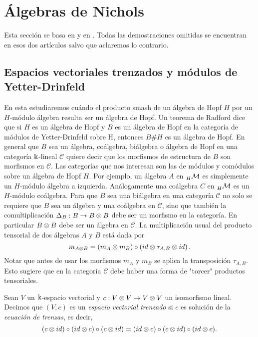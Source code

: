 \documentclass[a4paper,oneside,fleqn,11pt,../tesis.tex]{subfiles}
\begin{document}
\section{Álgebras de Nichols}
Esta sección se basa en  y en \myworries{[NA]}.
Todas las demostraciones omitidas se encuentran en esos dos artículos
salvo que aclaremos lo contrario.

\subsection{Espacios vectoriales trenzados y módulos de Yetter-Drinfeld}

En esta  estudiaremos cuándo el producto smash de un álgebra de Hopf $H$
por un $H$-módulo álgebra resulta ser un álgebra de Hopf.
Un teorema de Radford  dice que si $H$ es un álgebra de Hopf y $B$ es un 
álgebra de Hopf en la categoría de módulos de Yetter-Drinfeld sobre H, entonces $B\#H$ es un álgebra
de Hopf. En general que $B$ sea un álgebra, coálgebra, biálgebra o álgebra de Hopf en una categoría $\Bbbk$-lineal $\mathcal{C}$
quiere decir que los morfismos de estructura de $B$ son morfismos en $\mathcal{C}$. Las categorías que nos interesan
son las de módulos y comódulos sobre un álgebra de Hopf $H$. Por ejemplo, un álgebra $A$ en $\prescript{}{H}{\mathcal{M}}$
es simplemente un $H$-módulo álgebra a izquierda. Análogamente una coálgebra $C$ en $\prescript{}{H}{\mathcal{M}}$
es un $H$-módulo coálgebra. Para que $B$ sea una biálgebra en una categoría $\mathcal{C}$ no solo se requiere que $B$ sea
un álgebra y una coálgebra en $\mathcal{C}$, sino que también la comultiplicación $\Delta_B:B \to B\otimes B$ debe ser un morfismo en la categoría.
En particular $B\otimes B$ debe ser un álgebra en $\mathcal{C}$. La multiplicación usual del producto tensorial de dos álgebras
$A$ y $B$ está dada por 
\[
	m_{A\otimes B} = \left(m_A \otimes m_B\right) \circ \left(id \otimes \tau_{A, B} \otimes id\right).
\]
Notar que antes de usar los morfismos $m_A$ y $m_B$ se aplica la transposición $\tau_{A, B}$. Esto sugiere
que en la categoría $\mathcal{C}$ debe haber una forma de "torcer" productos tensoriales.

\begin{definition}
	Sean $V$ un $\Bbbk$-espacio vectorial y $c:V \otimes V \to V \otimes V$ un isomorfismo lineal. Decimos
	que $(V,c)$ es un \emph{espacio vectorial trenzado} si $c$ es solución de la \emph{ecuación de trenzas}, es decir,
	\[
		(c \otimes id)\circ(id \otimes c)\circ(c \otimes id) = (id \otimes c)\circ(c \otimes id)\circ(id \otimes c).
	\] 
\end{definition}
\end{document}
